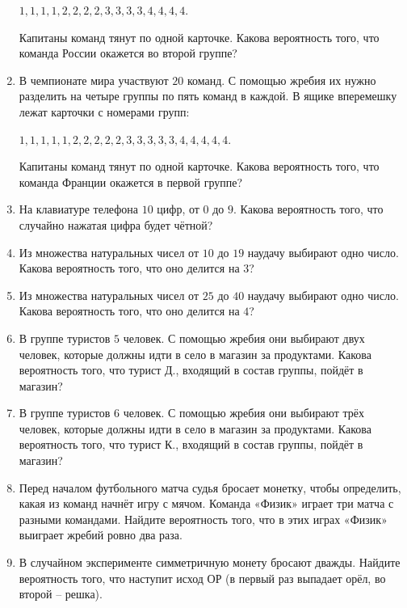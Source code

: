 \documentclass[12pt, a4paper]{article}
\begin{document}
\begin{enumerate}
		\( 1, 1, 1, 1, 2, 2, 2, 2, 3, 3, 3, 3, 4, 4, 4, 4 \).
		
		Капитаны команд тянут по одной карточке. Какова вероятность того, что команда России окажется во второй группе?
		\item В чемпионате мира участвуют \( 20 \) команд. С помощью жребия их нужно разделить на четыре группы по пять команд в каждой. В ящике вперемешку лежат карточки с номерами групп:
		
		
		\( 1, 1, 1, 1, 1, 2, 2, 2, 2, 2, 3, 3, 3, 3, 3, 4, 4, 4, 4, 4 \).
		
		
		Капитаны команд тянут по одной карточке. Какова вероятность того, что команда Франции окажется в первой группе?
		\item На клавиатуре телефона \( 10 \) цифр, от \( 0 \) до \( 9 \). Какова вероятность того, что случайно нажатая цифра будет чётной?
		\item Из множества натуральных чисел от \( 10 \) до \( 19 \) наудачу выбирают одно число. Какова вероятность того, что оно делится на \( 3 \)?
		\item Из множества натуральных чисел от \( 25 \) до \( 40 \) наудачу выбирают одно число. Какова вероятность того, что оно делится на \( 4 \)?
		\item В группе туристов \( 5  \) человек. С помощью жребия они выбирают двух человек, которые должны идти в село в магазин за продуктами. Какова вероятность того, что турист Д., входящий в состав группы, пойдёт в магазин?
		\item В группе туристов \( 6 \) человек. С помощью жребия они выбирают трёх человек, которые должны идти в село в магазин за продуктами. Какова вероятность того, что турист К., входящий в состав группы, пойдёт в магазин?
		\item Перед началом футбольного матча судья бросает монетку, чтобы определить, какая из команд начнёт игру с мячом. Команда «Физик» играет три матча с разными командами. Найдите вероятность того, что в этих играх «Физик» выиграет жребий ровно два раза.
		\item В случайном эксперименте симметричную монету бросают дважды. Найдите вероятность того, что наступит исход ОР (в первый раз выпадает орёл, во второй – решка).
	\end{enumerate}	
	
\end{document}
